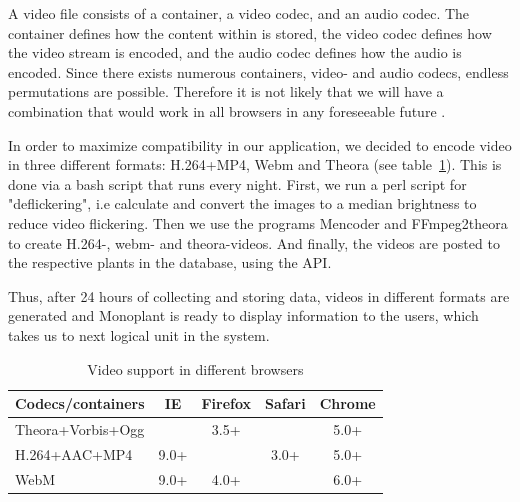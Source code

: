 A video file consists of a container, a video codec, and an audio codec. The container defines how the content within is stored, the video codec defines how the video stream is encoded, and the audio codec defines how the audio is encoded. Since there exists numerous containers, video- and audio codecs, endless permutations are possible. Therefore it is not likely that we will have a combination that would work in all browsers in any foreseeable future \citep{pilgrim2010html5}.

In order to maximize compatibility in our application, we decided to encode video in three different formats: H.264+MP4, Webm and Theora (see table~\ref{tab:videosupport}). This is done via a bash script that runs every night. First, we run a perl script for "deflickering", i.e calculate and convert the images to a median brightness to reduce video flickering. Then we use the programs Mencoder and FFmpeg2theora to create H.264-, webm- and theora-videos. And finally, the videos are posted to the respective plants in the database, using the API. 

Thus, after 24 hours of collecting and storing data, videos in different formats are generated and Monoplant is ready to display information to the users, which takes us to next logical unit in the system.

\begin{table}\centering
\begin{tabular}{@{}lcccc@{}} \toprule
Codecs/containers & IE & Firefox & Safari & Chrome \\ \midrule
Theora+Vorbis+Ogg & ~                 & 3.5+    & ~      & 5.0+   \\ 
H.264+AAC+MP4     & 9.0+              & ~       & 3.0+   & 5.0+   \\ 
WebM              & 9.0+              & 4.0+    & ~      & 6.0+   \\ \bottomrule
\end{tabular}
\caption{Video support in different browsers \citep{pilgrim2010html5}}
\label{tab:videosupport}
\end{table}


